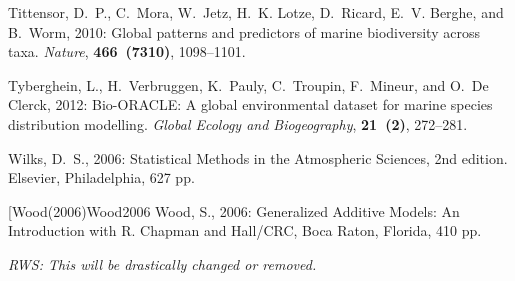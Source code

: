 \documentclass{ametsoc}
\begin{document}
\begin{thebibliography}{23}
Tittensor, D.~P., C.~Mora, W.~Jetz, H.~K. Lotze, D.~Ricard, E.~V. Berghe, and
  B.~Worm, 2010: {Global patterns and predictors of marine biodiversity across
  taxa}. \textit{Nature}, \textbf{466~(7310)}, 1098--1101.

Tyberghein, L., H.~Verbruggen, K.~Pauly, C.~Troupin, F.~Mineur, and O.~{De
  Clerck}, 2012: {Bio-ORACLE: A global environmental dataset for marine species
  distribution modelling}. \textit{Global Ecology and Biogeography},
  \textbf{21~(2)}, 272--281.

Wilks, D.~S., 2006: {Statistical Methods in the Atmospheric Sciences, 2nd edition}. 
  Elsevier, Philadelphia, 627 pp.

\bibitem[{Wood(2006)}{Wood2006}
Wood, S., 2006: {Generalized Additive Models: An Introduction with R}. Chapman 
  and Hall/CRC, Boca Raton, Florida, 410 pp.


\end{thebibliography}

%
\emph{RWS: This will be drastically changed or removed.}
\end{document}
